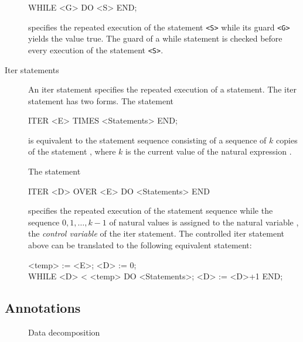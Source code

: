 \begin{description}
\begin{frag}
WHILE <G> DO <S> END;
\end{frag}

\noindent specifies the repeated execution of the statement {\tt <S>}
while its guard {\tt <G>} yields the value {\sf true}. The guard of a
while statement is checked before every execution of the statement
{\tt <S>}.

\item[Iter statements]

An iter statement specifies the repeated execution of a statement. The
iter statement has two forms. The statement

\begin{frag}
ITER <E> TIMES <Statements> END;
\end{frag}

\noindent is equivalent to the statement sequence consisting of a
sequence of $k$ copies of the statement , where $k$ is
the current value of the natural expression .

The statement

\begin{frag}
ITER <D> OVER <E> DO <Statements> END
\end{frag}

\noindent specifies the repeated execution of the statement sequence
 while the sequence $0,1,\dots,k-1$ of natural values
is assigned to the natural variable , the {\em control
variable} of the iter statement. The controlled iter statement above
can be translated to the following equivalent statement:

\begin{frag}
<temp> := <E>; <D> := 0;\\
WHILE <D> < <temp> DO <Statements>; <D> := <D>+1 END;
\end{frag}

\end{description}

\subsection*{Annotations}

\begin{figure}
\centering
\begin{minipage}{7cm}
\end{minipage}
\caption{Data decomposition  \label{DataDecomposition}}
\end{figure}

